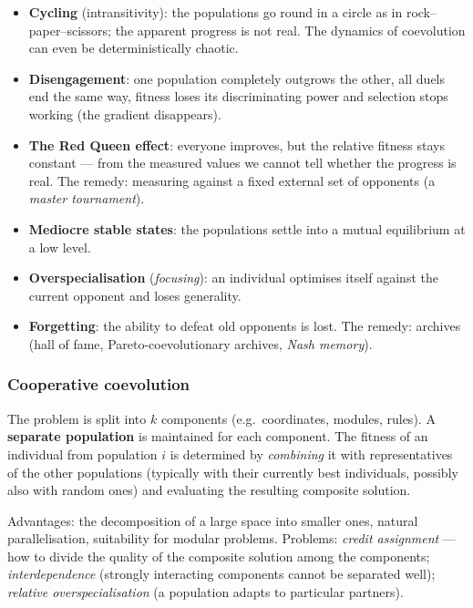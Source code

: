 \documentclass[11pt,a4paper]{article}
\theoremstyle{definition}
\begin{document}
\begin{itemize}
\item \textbf{Cycling} (intransitivity): the populations go round in a circle as
  in rock--paper--scissors; the apparent progress is not real. The dynamics of
  coevolution can even be deterministically chaotic.
\item \textbf{Disengagement}: one population completely outgrows the other, all
  duels end the same way, fitness loses its discriminating power and selection
  stops working (the gradient disappears).
\item \textbf{The Red Queen effect}: everyone improves, but the relative fitness
  stays constant --- from the measured values we cannot tell whether the
  progress is real. The remedy: measuring against a fixed external set of
  opponents (a \emph{master tournament}).
\item \textbf{Mediocre stable states}: the populations settle into a mutual
  equilibrium at a low level.
\item \textbf{Overspecialisation} (\emph{focusing}): an individual optimises
  itself against the current opponent and loses generality.
\item \textbf{Forgetting}: the ability to defeat old opponents is lost. The
  remedy: archives (hall of fame, Pareto-coevolutionary archives, \emph{Nash
  memory}).
\end{itemize}

\subsubsection{Cooperative coevolution}

\begin{defbox}
The problem is split into $k$ components (e.g.\ coordinates, modules, rules).
A \textbf{separate population} is maintained for each component. The fitness of
an individual from population $i$ is determined by \emph{combining} it with
representatives of the other populations (typically with their currently best
individuals, possibly also with random ones) and evaluating the resulting
composite solution.
\end{defbox}

Advantages: the decomposition of a large space into smaller ones, natural
parallelisation, suitability for modular problems. Problems: \emph{credit
assignment} --- how to divide the quality of the composite solution among the
components; \emph{interdependence} (strongly interacting components cannot be
separated well); \emph{relative overspecialisation} (a population adapts to
particular partners).
\end{document}
